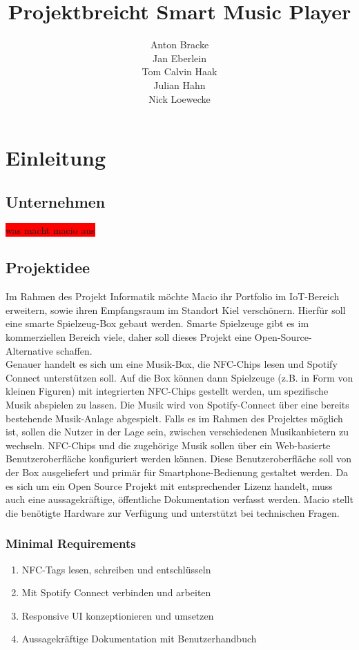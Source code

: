 \documentclass[10pt, a4paper, draft]{article}
\title{Projektbreicht Smart Music Player}
\author{Anton Bracke\\Jan Eberlein\\Tom Calvin Haak\\Julian Hahn\\Nick Loewecke}
\begin{document}
\maketitle
\tableofcontents

\section{Einleitung}
\subsection{Unternehmen}
\colorbox{red}{was macht macio aus}
\subsection{Projektidee}
Im Rahmen des Projekt Informatik möchte Macio ihr Portfolio im IoT-Bereich erweitern, sowie ihren Empfangsraum im Standort Kiel verschönern.
Hierfür soll eine smarte Spielzeug-Box gebaut werden.
Smarte Spielzeuge gibt es im kommerziellen Bereich viele, daher soll dieses Projekt eine Open-Source-Alternative schaffen.\\
Genauer handelt es sich um eine Musik-Box, die NFC-Chips lesen und Spotify Connect unterstützen soll.
Auf die Box können dann Spielzeuge (z.B. in Form von kleinen Figuren) mit integrierten NFC-Chips gestellt werden, um spezifische Musik abspielen zu lassen.
Die Musik wird von Spotify-Connect über eine bereits bestehende Musik-Anlage abgespielt.
Falls es im Rahmen des Projektes möglich ist, sollen die Nutzer in der Lage sein, zwischen verschiedenen Musikanbietern zu wechseln.
NFC-Chips und die zugehörige Musik sollen über ein Web-basierte Benutzeroberfläche konfiguriert werden können.
Diese Benutzeroberfläche soll von der Box ausgeliefert und primär für Smartphone-Bedienung gestaltet werden.
Da es sich um ein Open Source Projekt mit entsprechender Lizenz handelt, muss auch eine aussagekräftige, öffentliche Dokumentation verfasst werden.
Macio stellt die benötigte Hardware zur Verfügung und unterstützt bei technischen Fragen.

\subsubsection{Minimal Requirements}
\begin{enumerate}
  \item NFC-Tags lesen, schreiben und entschlüsseln
  \item Mit Spotify Connect verbinden und arbeiten
  \item Responsive UI konzeptionieren und umsetzen
  \item Aussagekräftige Dokumentation mit Benutzerhandbuch
\end{enumerate}
\end{document}
